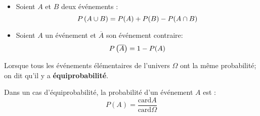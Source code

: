 


 \summary{}
 
 \begin{property}
 \begin{itemize}
 \item Soient $A $ et $ B$ deux événements : \[P\left(A\cup B\right)=P(A)+P(B)-P(A\cap B)\]
 \item Soient $A $ un  événement et $ \overline{A}$  son événement contraire: \[P\left(\overline{A}\right)=1-P(A)\]
 \end{itemize}
 \end{property}
   \begin{definition}
   Lorsque tous les événements élémentaires de l'univers $ \Omega $ ont la même probabilité; on dit qu'il y a \textbf{équiprobabilité}.
  \end{definition}

  
  \begin{property}
  Dans un cas d'équiprobabilité, la probabilité d'un événement $A$ est : $$ P(A)=\frac{\text{card}A }{\text{card}\Omega}$$
  \end{property}

  

